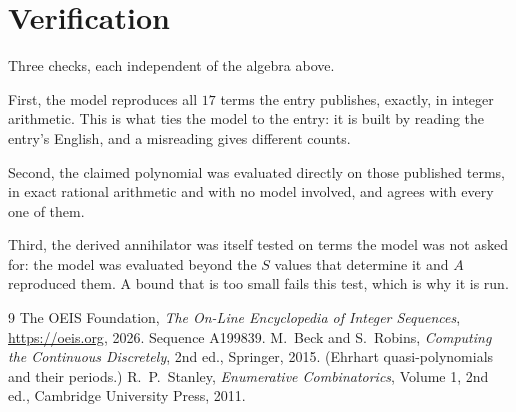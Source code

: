 \documentclass[11pt,a4paper]{article}
\theoremstyle{plain}
\theoremstyle{definition}
\begin{document}
\section{Verification}

Three checks, each independent of the algebra above.

First, the model reproduces all $17$ terms the entry publishes, exactly, in integer
arithmetic. This is what ties the model to the entry: it is built by reading the entry's
English, and a misreading gives different counts.

Second, the claimed polynomial was evaluated directly on those published terms, in exact
rational arithmetic and with no model involved, and agrees with every one of them.

Third, the derived annihilator was itself tested on terms the model was not asked for: the
model was evaluated beyond the $S$ values that determine it and $A$ reproduced them. A bound
that is too small fails this test, which is why it is run.

\begin{thebibliography}{9}
 The OEIS Foundation, \emph{The On-Line Encyclopedia of Integer
Sequences}, \url{https://oeis.org}, 2026. Sequence A199839.
 M.~Beck and S.~Robins, \emph{Computing the Continuous Discretely},
2nd ed., Springer, 2015. (Ehrhart quasi-polynomials and their periods.)
 R.~P.~Stanley, \emph{Enumerative Combinatorics}, Volume 1, 2nd ed.,
Cambridge University Press, 2011.
\end{thebibliography}
\end{document}
